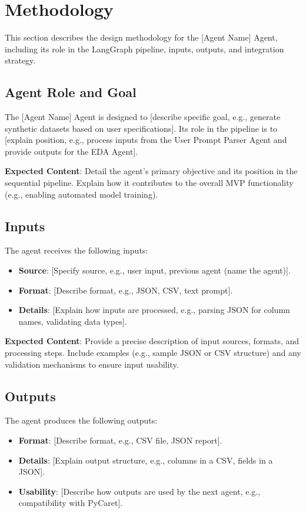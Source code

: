 \documentclass{article}
\begin{document}
\section{Methodology}
This section describes the design methodology for the [Agent Name] Agent, including its role in the LangGraph pipeline, inputs, outputs, and integration strategy.

\subsection{Agent Role and Goal}
The [Agent Name] Agent is designed to [describe specific goal, e.g., generate synthetic datasets based on user specifications]. Its role in the pipeline is to [explain position, e.g., process inputs from the User Prompt Parser Agent and provide outputs for the EDA Agent].

\textbf{Expected Content}: Detail the agent’s primary objective and its position in the sequential pipeline. Explain how it contributes to the overall MVP functionality (e.g., enabling automated model training).

\subsection{Inputs}
The agent receives the following inputs:
\begin{itemize}[label=--]
    \item \textbf{Source}: [Specify source, e.g., user input, previous agent (name the agent)].
    \item \textbf{Format}: [Describe format, e.g., JSON, CSV, text prompt].
    \item \textbf{Details}: [Explain how inputs are processed, e.g., parsing JSON for column names, validating data types].
\end{itemize}

\textbf{Expected Content}: Provide a precise description of input sources, formats, and processing steps. Include examples (e.g., sample JSON or CSV structure) and any validation mechanisms to ensure input usability.

\subsection{Outputs}
The agent produces the following outputs:
\begin{itemize}[label=--]
    \item \textbf{Format}: [Describe format, e.g., CSV file, JSON report].
    \item \textbf{Details}: [Explain output structure, e.g., columns in a CSV, fields in a JSON].
    \item \textbf{Usability}: [Describe how outputs are used by the next agent, e.g., compatibility with PyCaret].
\end{itemize}
\end{document}
